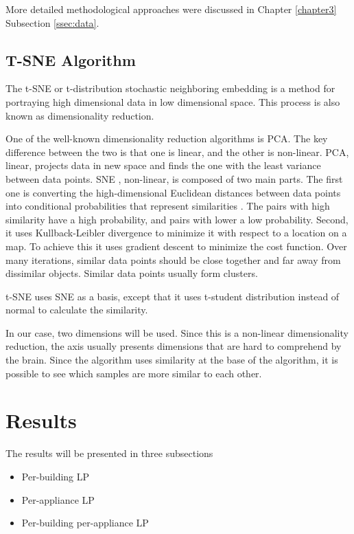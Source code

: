 More detailed methodological approaches were discussed in Chapter \ref{chapter3} Subsection \ref{ssec:data}.

\subsection{T-SNE Algorithm}

The t-SNE \cite{tsne2} or t-distribution stochastic neighboring embedding is a method for portraying high dimensional 
data in low dimensional space. This process is also known as dimensionality reduction.

One of the well-known dimensionality reduction algorithms is PCA.
The key difference between the two is that one is linear, and the other is non-linear.
PCA, linear, projects data in new space and finds the one with the least variance between data points.
SNE \cite{sne1}, non-linear, is composed of two main parts. The first one is 
converting the high-dimensional Euclidean distances between data points into conditional probabilities that represent similarities \cite{sne1}.
The pairs with high similarity have a high probability, and pairs with lower a low probability.
Second, it uses Kullback-Leibler divergence to minimize it with respect to a location on a map.
To achieve this it uses gradient descent to minimize the cost function.
Over many iterations, similar data points should be close together and far away from dissimilar objects.
Similar data points usually form clusters.

t-SNE uses SNE as a basis, except that it uses t-student distribution instead of normal to calculate the similarity.

In our case, two dimensions will be used. Since this is a non-linear dimensionality reduction,
the axis usually presents dimensions that are hard to comprehend by the brain. 
Since the algorithm uses similarity at the base of the algorithm, it is possible to 
see which samples are more similar to each other.


\section{Results}

The results will be presented in three subsections

\begin{itemize}
	\item Per-building LP
	\item Per-appliance LP
	\item Per-building per-appliance LP
\end{itemize}

